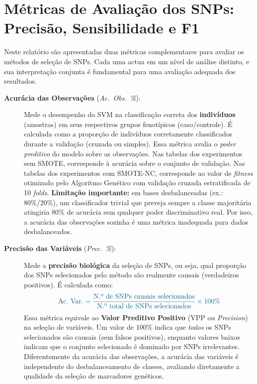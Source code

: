 \documentclass[12pt,a4paper]{article}
\newcommand{\novo}[1]{\textcolor{corNova}{#1}}
\begin{document}

\section*{\novo{Métricas de Avaliação dos SNPs: Precisão, Sensibilidade e F1}}

\novo{Neste relatório são apresentadas duas métricas complementares para avaliar os métodos de seleção de SNPs. Cada uma actua em um nível de análise distinto, e sua interpretação conjunta é fundamental para uma avaliação adequada dos resultados.}

\begin{description}
  \item[\novo{\textbf{Acurácia das Observações} (\textit{Ac.\ Obs.\ \%}):}]
  \novo{Mede o desempenho do SVM na classificação correta dos \textbf{indivíduos} (amostras) em seus respectivos grupos fenotípicos (caso/controle). É calculada como a proporção de indivíduos corretamente classificados durante a validação (cruzada ou simples). Essa métrica avalia o \emph{poder preditivo} do modelo sobre as observações. Nas tabelas dos experimentos sem SMOTE, corresponde à acurácia sobre o conjunto de validação. Nas tabelas dos experimentos com SMOTE-NC, corresponde ao valor de \textit{fitness} otimizado pelo Algoritmo Genético com validação cruzada estratificada de 10 \textit{folds}. \textbf{Limitação importante:} em bases desbalanceadas (ex.: 80\%/20\%), um classificador trivial que preveja sempre a classe majoritária atingiria 80\% de acurácia sem qualquer poder discriminativo real. Por isso, a acurácia das observações sozinha é uma métrica inadequada para dados desbalanceados.}

  \item[\novo{\textbf{Precisão das Variáveis} (\textit{Prec.\ \%}):}]
  \novo{Mede a \textbf{precisão biológica} da seleção de SNPs, ou seja, qual proporção dos SNPs selecionados pelo método são realmente causais (verdadeiros positivos). É calculada como:}
  \[
    \novo{\text{Ac.\ Var.} = \frac{\text{N.º de SNPs causais selecionados}}{\text{N.º total de SNPs selecionados}} \times 100\%}
  \]
  \novo{Essa métrica equivale ao \textbf{Valor Preditivo Positivo} (VPP ou \textit{Precision}) na seleção de variáveis. Um valor de 100\% indica que \emph{todos} os SNPs selecionados são causais (sem falsos positivos), enquanto valores baixos indicam que o conjunto selecionado é dominado por SNPs irrelevantes. Diferentemente da acurácia das observações, a acurácia das variáveis é independente do desbalanceamento de classes, avaliando diretamente a qualidade da seleção de marcadores genéticos.}


\end{description}
\end{document}
